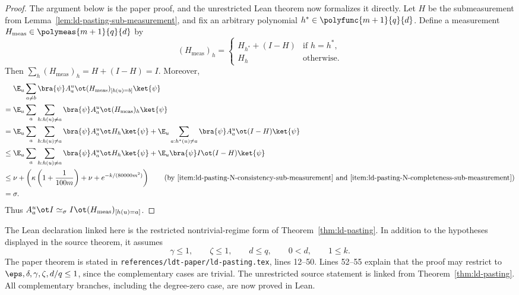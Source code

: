 \begin{proof}
	\leanok
	The argument below is the paper proof, and the unrestricted Lean theorem now
	formalizes it directly.
	Let $H$ be the submeasurement from Lemma~\ref{lem:ld-pasting-sub-measurement}, and fix an arbitrary polynomial $h^* \in \polyfunc{m+1}{q}{d}$. Define a measurement $H_{\mathrm{meas}} \in \polymeas{m+1}{q}{d}$ by
	\[
		(H_{\mathrm{meas}})_h
		=
		\begin{cases}
			H_{h^*} + (I-H) & \text{if } h=h^*, \\
			H_h             & \text{otherwise.}
		\end{cases}
	\]
	Then $\sum_h (H_{\mathrm{meas}})_h = H + (I-H) = I$. Moreover,
	\begin{align*}
		      & \E_u \sum_{a \ne b} \bra{\psi} A_a^u \ot (H_{\mathrm{meas}})_{[h(u)=b]} \ket{\psi}                            \\
		={}   & \E_u \sum_a \sum_{h:h(u)\ne a} \bra{\psi} A_a^u \ot (H_{\mathrm{meas}})_h \ket{\psi}                          \\
		={}   & \E_u \sum_a \sum_{h:h(u)\ne a} \bra{\psi} A_a^u \ot H_h \ket{\psi}
		+ \E_u \sum_{a:h^*(u)\ne a} \bra{\psi} A_a^u \ot (I-H) \ket{\psi}                                                     \\
		\le{} & \E_u \sum_a \sum_{h:h(u)\ne a} \bra{\psi} A_a^u \ot H_h \ket{\psi}
		+ \E_u \bra{\psi} I \ot (I-H) \ket{\psi}                                                                              \\
		\le{} & \nu + \left(\kappa\left(1+\frac{1}{100m}\right) + \nu + e^{-k/(80000m^2)}\right)
		\tag{by \ref{item:ld-pasting-N-consistency-sub-measurement} and \ref{item:ld-pasting-N-completeness-sub-measurement}} \\
		={}   & \sigma.
	\end{align*}
	Thus $A_a^u \ot I \simeq_\sigma I \ot (H_{\mathrm{meas}})_{[h(u)=a]}$.
\end{proof}

\begin{remark}\label{rem:ld-pasting-restricted-lean-form}
	The Lean declaration linked here is the restricted nontrivial-regime form of
	Theorem~\ref{thm:ld-pasting}.  In addition to the hypotheses displayed in the
	source theorem, it assumes
	\[
		\gamma \le 1,\qquad \zeta \le 1,\qquad d \le q,\qquad 0<d,\qquad 1\le k.
	\]
	The paper theorem is stated in
	\texttt{references/ldt-paper/ld-pasting.tex}, lines 12--50.  Lines 52--55
	explain that the proof may restrict to
	\(\eps,\delta,\gamma,\zeta,d/q\le 1\), since the complementary cases are
	trivial.  The unrestricted source statement is linked from
	Theorem~\ref{thm:ld-pasting}.  All complementary branches, including the
	degree-zero case, are now proved in Lean.
\end{remark}

